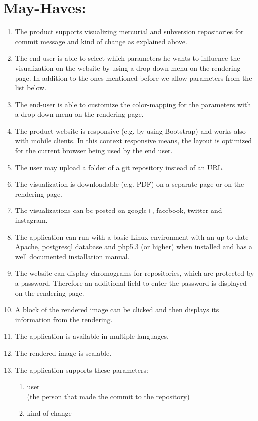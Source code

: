 \documentclass[12pt]{scrartcl}
\begin{document}
\section{May-Haves:}
\begin{enumerate}
\item The product supports visualizing mercurial and subversion repositories for commit message and kind of change as explained above.
\item The end-user is able to select which parameters he wants to influence the visualization on the website by using a drop-down menu on the rendering page. In addition to the ones mentioned before we allow parameters from the list below.
\item The end-user is able to customize the color-mapping for the parameters with  a drop-down menu on the rendering page.
\item The product website is responsive (e.g. by using Bootstrap) and works also with mobile clients. In this context responsive means, the layout is optimized for the current browser being used by the end user.
\item The user may upload a folder of a git repository instead of an URL.
\item The visualization is downloadable (e.g. PDF) on a separate page or on the rendering page.
\item The visualizations can be posted on google+, facebook, twitter and instagram.
\item The application can run with a basic Linux environment with an up-to-date Apache, postgresql database and php5.3 (or higher) when installed and has a well documented installation manual.
\item The website can display chromograms for repositories, which are protected by a password. Therefore an additional field to enter the password is displayed on the rendering page.
\item A block of the rendered image can be clicked and then displays its information from the rendering.
\item The application is available in multiple languages.
\item The rendered image is scalable.
\item The application supports these parameters:
\begin{enumerate}
\item user\\
(the person that made the commit to the repository)
\item kind of change\\  

\end{enumerate}
\end{enumerate}
\end{document}
